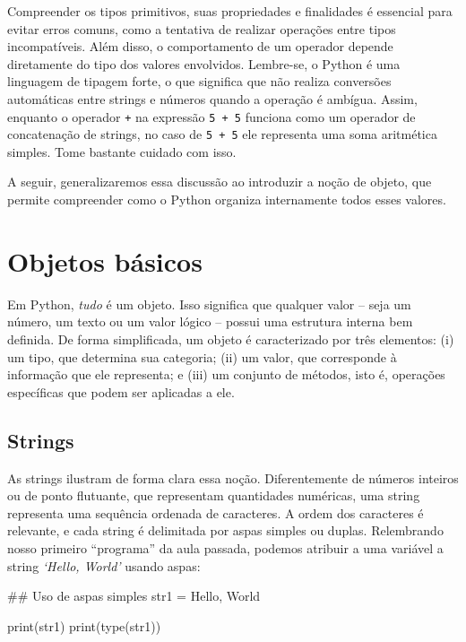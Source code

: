 \documentclass[
  brazilian,
  letterpaper,
  DIV=11,
  numbers=noendperiod]{scrreprt}
\newenvironment{Shaded}{\begin{snugshade}}{\end{snugshade}}
\newcommand{\BuiltInTok}[1]{\textcolor[rgb]{0.00,0.23,0.31}{#1}}
\newcommand{\CommentTok}[1]{\textcolor[rgb]{0.37,0.37,0.37}{#1}}
\newcommand{\NormalTok}[1]{\textcolor[rgb]{0.00,0.23,0.31}{#1}}
\newcommand{\OperatorTok}[1]{\textcolor[rgb]{0.37,0.37,0.37}{#1}}
\newcommand{\StringTok}[1]{\textcolor[rgb]{0.13,0.47,0.30}{#1}}
\begin{document}
Compreender os tipos primitivos, suas propriedades e finalidades é
essencial para evitar erros comuns, como a tentativa de realizar
operações entre tipos incompatíveis. Além disso, o comportamento de um
operador depende diretamente do tipo dos valores envolvidos. Lembre-se,
o Python é uma linguagem de tipagem forte, o que significa que não
realiza conversões automáticas entre strings e números quando a operação
é ambígua. Assim, enquanto o operador \texttt{+} na expressão
\texttt{\textquotesingle{}5\textquotesingle{}\ +\ \textquotesingle{}5\textquotesingle{}}
funciona como um operador de concatenação de strings, no caso de
\texttt{5\ +\ 5} ele representa uma soma aritmética simples. Tome
bastante cuidado com isso.

A seguir, generalizaremos essa discussão ao introduzir a noção de
objeto, que permite compreender como o Python organiza internamente
todos esses valores.

\section{Objetos básicos}\label{objetos-buxe1sicos}

Em Python, \emph{tudo} é um objeto. Isso significa que qualquer valor --
seja um número, um texto ou um valor lógico -- possui uma estrutura
interna bem definida. De forma simplificada, um objeto é caracterizado
por três elementos: (i) um tipo, que determina sua categoria; (ii) um
valor, que corresponde à informação que ele representa; e (iii) um
conjunto de métodos, isto é, operações específicas que podem ser
aplicadas a ele.

\subsection{Strings}\label{strings}

As strings ilustram de forma clara essa noção. Diferentemente de números
inteiros ou de ponto flutuante, que representam quantidades numéricas,
uma string representa uma sequência ordenada de caracteres. A ordem dos
caracteres é relevante, e cada string é delimitada por aspas simples ou
duplas. Relembrando nosso primeiro ``programa'' da aula passada, podemos
atribuir a uma variável a string \emph{`Hello, World'} usando aspas:

\begin{Shaded}
\begin{Highlighting}[]
\CommentTok{\#\# Uso de aspas simples}
\NormalTok{str1 }\OperatorTok{=} \StringTok{\textquotesingle{}Hello, World\textquotesingle{}}

\BuiltInTok{print}\NormalTok{(str1)}
\BuiltInTok{print}\NormalTok{(}\BuiltInTok{type}\NormalTok{(str1))}
\end{Highlighting}
\end{Shaded}
\end{document}

